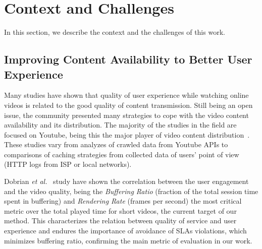 \section{Context and Challenges}
\label{sec:context}


In this section, we describe the context and the challenges of this
work.

\subsection{Improving Content Availability to Better
User Experience}

Many studies have shown that quality of user experience while watching
online videos is related to the good quality of content transmission.
Still being an open issue, the community presented many strategies to
cope with the video content availability and its distribution.  The
majority of the studies in the field are focused on Youtube, being
this the major player of video content
distribution~\cite{youtube_wsdm_2011, Adhikari_infocom_2012,
Brodersen_www_2012, Braun_noms_2012}. These studies vary
from analyzes of crawled data from Youtube APIs to comparisons of
caching strategies from collected data of users' point of view (HTTP
logs from ISP or local networks).

Dobrian \emph{et al.}~\cite{Dobrian_sigcomm_2011} study have shown the
correlation between the user engagement and the video quality, being
the \emph{Buffering Ratio} (fraction of the total session time spent
in buffering) and \emph{Rendering Rate} (frames per second) the most
critical metric over the total played time for short videos, the
current target of our method. This characterizes the relation between
quality of service and user experience and endures the importance of
avoidance of SLAs violations, which minimizes buffering ratio,
confirming the main metric of  evaluation in our work. 

